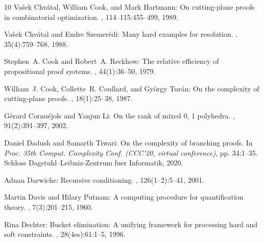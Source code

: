 \begin{thebibliography}{10}
{\sc Va{\v{s}}ek Chv{\'a}tal, William Cook, and Mark Hartmann}: On
  cutting-plane proofs in combinatorial optimization.
, 114--115:455--499, 1989.
\newblock [\epfmtdoi{10.1016/0024-3795(89)90476-x}]

{\sc Va{\v{s}}ek Chv{\'{a}}tal and Endre Szemer{\'{e}}di}: Many hard examples
  for resolution.
, 35(4):759--768, 1988.
\newblock [\epfmtdoi{10.1145/48014.48016}]

{\sc Stephen~A. Cook and Robert~A. Reckhow}: The relative efficiency of
  propositional proof systems.
, 44(1):36--50, 1979.
\newblock [\epfmtdoi{10.2307/2273702}]

{\sc William~J. Cook, Collette~R. Coullard, and Gy{\"o}rgy Tur{\'a}n}: On the
  complexity of cutting-plane proofs.
, 18(1):25--38, 1987.
\newblock [\epfmtdoi{10.1016/0166-218X(87)90039-4}]

{\sc G{\'{e}}rard Cornu{\'{e}}jols and Yanjun Li}: On the rank of mixed 0, 1
  polyhedra.
, 91(2):391--397, 2002.
\newblock [\epfmtdoi{10.1007/s101070100250}]

{\sc Daniel Dadush and Samarth Tiwari}: On the complexity of branching proofs.
\newblock In {\em Proc. 35th Comput. Complexity Conf. (CCC'20, virtual
  conference)}, pp. 34:1--35. Schloss Dagstuhl--Leibniz-Zentrum fuer
  Informatik, 2020.

{\sc Adnan Darwiche}: Recursive conditioning.
, 126(1--2):5--41, 2001.
\newblock [\epfmtdoi{10.1016/S0004-3702(00)00069-2}]

{\sc Martin Davis and Hilary Putnam}: A computing procedure for quantification
  theory.
, 7(3):201--215, 1960.
\newblock [\epfmtdoi{10.1145/321033.321034}]

{\sc Rina Dechter}: Bucket elimination: {A} unifying framework for processing
  hard and soft constraints.
, 28(4es):61:1--5, 1996.
\newblock [\epfmtdoi{10.1145/242224.242302}]


\end{thebibliography}

